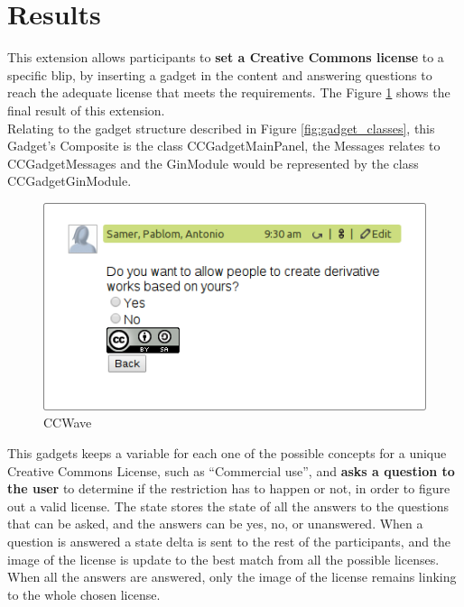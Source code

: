 \section{Results}
This extension allows participants to \textbf{set a Creative Commons license} to a specific blip, by inserting a gadget in the content and answering questions to reach the adequate license that meets the requirements. The Figure \ref{fig:cc_gadget} shows the final result of this extension.\\[.2cm]
Relating to the gadget structure described in Figure \ref{fig:gadget_classes}, this Gadget's Composite is the class CCGadgetMainPanel, the Messages relates to CCGadgetMessages and the GinModule would be represented by the class CCGadgetGinModule.
\begin{figure}[H]
  \center
    \includegraphics[keepaspectratio, scale=0.7]{Media/Captures/Extensions/CCGadget.png}
  \caption{CCWave}
  \label{fig:cc_gadget}
\end{figure}
This gadgets keeps a variable for each one of the possible concepts for a unique Creative Commons License, such as ``Commercial use'', and \textbf{asks a question to the user} to determine if the restriction has to happen or not, in order to figure out a valid license. The state stores the state of all the answers to the questions that can be asked, and the answers can be yes, no, or unanswered. When a question is answered a state delta is sent to the rest of the participants, and the image of the license is update to the best match from all the possible licenses. When all the answers are answered, only the image of the license remains linking to the whole chosen license.\\[.2cm]
